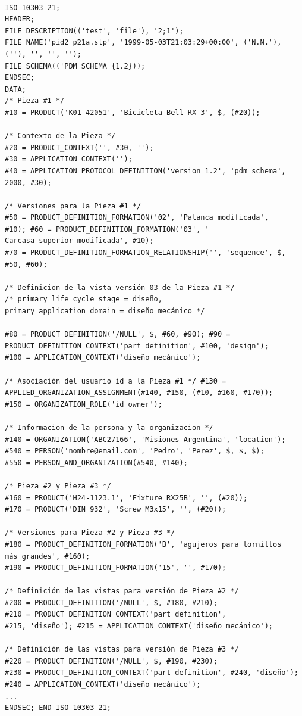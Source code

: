 \begin{verbatim}

ISO-10303-21; 
HEADER; 
FILE_DESCRIPTION(('test', 'file'), '2;1');
FILE_NAME('pid2_p21a.stp', '1999-05-03T21:03:29+00:00', ('N.N.'),
(''), '', '', ''); 
FILE_SCHEMA(('PDM_SCHEMA {1.2})); 
ENDSEC; 
DATA;
/* Pieza #1 */ 
#10 = PRODUCT('K01-42051', 'Bicicleta Bell RX 3', $, (#20));

/* Contexto de la Pieza */ 
#20 = PRODUCT_CONTEXT('', #30, ''); 
#30 = APPLICATION_CONTEXT(''); 
#40 = APPLICATION_PROTOCOL_DEFINITION('version 1.2', 'pdm_schema',
2000, #30);

/* Versiones para la Pieza #1 */ 
#50 = PRODUCT_DEFINITION_FORMATION('02', 'Palanca modificada',
#10); #60 = PRODUCT_DEFINITION_FORMATION('03', '
Carcasa superior modificada', #10); 
#70 = PRODUCT_DEFINITION_FORMATION_RELATIONSHIP('', 'sequence', $,
#50, #60);

/* Definicion de la vista versión 03 de la Pieza #1 */ 
/* primary life_cycle_stage = diseño, 
primary application_domain = diseño mecánico */ 

#80 = PRODUCT_DEFINITION('/NULL', $, #60, #90); #90 =
PRODUCT_DEFINITION_CONTEXT('part definition', #100, 'design');
#100 = APPLICATION_CONTEXT('diseño mecánico');

/* Asociación del usuario id a la Pieza #1 */ #130 =
APPLIED_ORGANIZATION_ASSIGNMENT(#140, #150, (#10, #160, #170));
#150 = ORGANIZATION_ROLE('id owner');

/* Informacion de la persona y la organizacion */ 
#140 = ORGANIZATION('ABC27166', 'Misiones Argentina', 'location');
#540 = PERSON('nombre@email.com', 'Pedro', 'Perez', $, $, $);
#550 = PERSON_AND_ORGANIZATION(#540, #140);

/* Pieza #2 y Pieza #3 */ 
#160 = PRODUCT('H24-1123.1', 'Fixture RX25B', '', (#20)); 
#170 = PRODUCT('DIN 932', 'Screw M3x15', '', (#20));

/* Versiones para Pieza #2 y Pieza #3 */ 
#180 = PRODUCT_DEFINITION_FORMATION('B', 'agujeros para tornillos
más grandes', #160); 
#190 = PRODUCT_DEFINITION_FORMATION('15', '', #170);

/* Definición de las vistas para versión de Pieza #2 */ 
#200 = PRODUCT_DEFINITION('/NULL', $, #180, #210); 
#210 = PRODUCT_DEFINITION_CONTEXT('part definition',
#215, 'diseño'); #215 = APPLICATION_CONTEXT('diseño mecánico');

/* Definición de las vistas para versión de Pieza #3 */ 
#220 = PRODUCT_DEFINITION('/NULL', $, #190, #230); 
#230 = PRODUCT_DEFINITION_CONTEXT('part definition', #240, 'diseño'); 
#240 = APPLICATION_CONTEXT('diseño mecánico');
...
ENDSEC; END-ISO-10303-21;
\end{verbatim}


